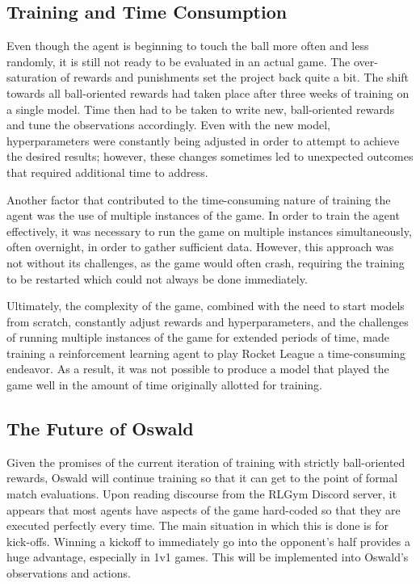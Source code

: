 \documentclass[10pt,twocolumn]{article}
\begin{document}
 \subsection{Training and Time Consumption}
 Even though the agent is beginning to touch the ball more 
 often and less randomly, it is still not ready to be 
 evaluated in an actual game. The over-saturation of rewards 
 and punishments set the project back quite a bit. The shift 
 towards all ball-oriented rewards had taken place after 
 three weeks of training on a single model. Time then had to 
 be taken to write new, ball-oriented rewards and tune the 
 observations accordingly. Even with the new model, 
 hyperparameters were constantly being adjusted in order to 
 attempt to achieve the desired results; however, these 
 changes sometimes led to unexpected outcomes that required 
 additional time to address.
 
 Another factor that contributed to the time-consuming nature 
 of training the agent was the use of multiple instances of 
 the game. In order to train the agent effectively, it was 
 necessary to run the game on multiple instances 
 simultaneously, often overnight, in order to gather 
 sufficient data. However, this approach was not without its 
 challenges, as the game would often crash, requiring the 
 training to be restarted which could not always be done 
 immediately.
 
 Ultimately, the complexity of the game, combined with the 
 need to start models from scratch, constantly adjust rewards 
 and hyperparameters, and the challenges of running multiple 
 instances of the game for extended periods of time, made 
 training a reinforcement learning agent to play Rocket 
 League a time-consuming endeavor. As a result, it was not 
 possible to produce a model that played the game well in the 
 amount of time originally allotted for training.


\subsection{The Future of Oswald}
 Given the promises of the current iteration of training with 
 strictly ball-oriented rewards, Oswald will continue 
 training so that it can get to the point of formal match 
 evaluations. Upon reading discourse from the RLGym Discord 
 server, it appears that most agents have aspects of the game 
 hard-coded so that they are executed perfectly every time. 
 The main situation in which this is done is for kick-offs. 
 Winning a kickoff to immediately go into the opponent's half 
 provides a huge advantage, especially in 1v1 games. This 
 will be implemented into Oswald's observations and actions. 
 
\end{document}
